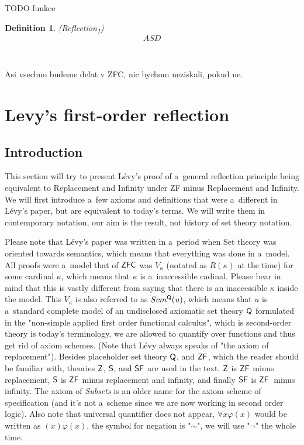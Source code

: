 \documentclass[12pt,a4paper]{article}
\newtheorem{definition}[theorem]{Definition}
\begin{document}
TODO funkce

\begin{definition}{(\emph{Reflection\textsubscript{1}})}\label{def:reflection_1}\\
\begin{equation}
ASD
\end{equation}
\end{definition}
\

Asi vsechno budeme delat v ZFC, nic bychom neziskali, pokud ne.

\newpage
\section{Levy's first-order reflection}\label{sec:fixed}

\subsection{Introduction}
This section will try to present Lévy's proof of a~general reflection principle being equivalent to Replacement and Infinity under ZF minus Replacement and Infinity.
We will first introduce a~few axioms and definitions that were a~different in Lévy's paper\cite{Levy60a}, but are equivalent to today's terms. We will write them in contemporary notation, our aim is the result, not history of set theory notation. 

Please note that Lévy's paper was written in a~period when Set theory was oriented towards semantics, which means that everything was done in a~model. 
All proofs were a~model that of $\sf{ZFC}$ was $V_\kappa$ (notated as $R(\kappa)$ at the time) for some cardinal $\kappa$, which means that $\kappa$ is a~inaccessible cadinal.  %
Please bear in mind that this is vastly different from saying that there is an inaccessible $\kappa$ inside the model. This $V_\kappa$ is also referred to as $Scm^{\sf{Q}}(u)$, which means that $u$ is a~standard complete model of an undisclosed axiomatic set theory $\sf{Q}$ formulated in the "non-simple applied first order functional calculus", which is second-order theory is today's terminology, we are allowed to quantify over functions and thus get rid of axiom schemes. (Note that Lévy always speaks of "the axiom of replacement"). Besides placeholder set theory $\sf{Q}$, and $\sf{ZF}$, which the reader should be familiar with, theories $\sf{Z}$, $\sf{S}$, and $\sf{SF}$ are used in the text. $\sf{Z}$ is $\sf{ZF}$ minus replacement, $\sf{S}$ is $\sf{ZF}$ minus replacement and infinity, and finally $\sf{SF}$ is $\sf{ZF}$ minus infinity. The axiom of \emph{Subsets} is an older name for the axiom scheme of specification (and it's not a~scheme since we are now working in second order logic). Also note that universal quantifier does not appear, $\forall x \varphi (x)$ would be written as $(x) \varphi (x)$, the symbol for negation is "$\sim$", we will use "$\neg$" the whole time.
\end{document}
